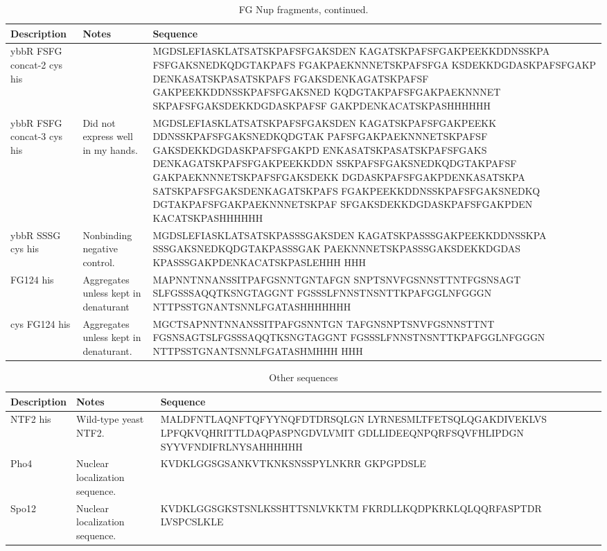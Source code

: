 \begin{table}[b!]
\centering
  \caption[FG Nup sequences, continued.]{FG Nup fragments, continued.}
    \label{table:FSFG}
    \begin{tabular}{p{3.5cm}p{4cm}p{8cm}}
      Description & Notes &Sequence \\
\hline
	ybbR FSFG concat-2 cys his& & MGDSLEFIASKLATSATSKPAFSFGAKSDEN
KAGATSKPAFSFGAKPEEKKDDNSSKPA
FSFGAKSNEDKQDGTAKPAFS
FGAKPAEKNNNETSKPAFSFGA
KSDEKKDGDASKPAFSFGAKP
DENKASATSKPASATSKPAFS
FGAKSDENKAGATSKPAFSF
GAKPEEKKDDNSSKPAFSFGAKSNED
KQDGTAKPAFSFGAKPAEKNNNET
SKPAFSFGAKSDEKKDGDASKPAFSF
GAKPDENKACATSKPASHHHHHH\\
      \hline
	ybbR FSFG concat-3 cys his& Did not express well in my hands.& MGDSLEFIASKLATSATSKPAFSFGAKSDEN
KAGATSKPAFSFGAKPEEKK
DDNSSKPAFSFGAKSNEDKQDGTAK
PAFSFGAKPAEKNNNETSKPAFSF
GAKSDEKKDGDASKPAFSFGAKPD
ENKASATSKPASATSKPAFSFGAKS
DENKAGATSKPAFSFGAKPEEKKDDN
SSKPAFSFGAKSNEDKQDGTAKPAFSF
GAKPAEKNNNETSKPAFSFGAKSDEKK
DGDASKPAFSFGAKPDENKASATSKPA
SATSKPAFSFGAKSDENKAGATSKPAFS
FGAKPEEKKDDNSSKPAFSFGAKSNEDKQ
DGTAKPAFSFGAKPAEKNNNETSKPAF
SFGAKSDEKKDGDASKPAFSFGAKPDEN
KACATSKPASHHHHHH\\
\hline
ybbR SSSG cys his & Nonbinding negative control. & MGDSLEFIASKLATSATSKPASSSGAKSDEN
KAGATSKPASSSGAKPEEKKDDNSSKPA
SSSGAKSNEDKQDGTAKPASSSGAK
PAEKNNNETSKPASSSGAKSDEKKDGDAS
KPASSSGAKPDENKACATSKPASLEHHH
HHH\\
	\hline

	FG124 his& Aggregates unless kept in denaturant & MAPNNTNNANSSITPAFGSNNTGNTAFGN
SNPTSNVFGSNNSTTNTFGSNSAGT
SLFGSSSAQQTKSNGTAGGNT
FGSSSLFNNSTNSNTTKPAFGGLNFGGGN
NTTPSSTGNANTSNNLFGATASHHHHHHH\\
\hline
	cys FG124 his& Aggregates unless kept in denaturant. & MGCTSAPNNTNNANSSITPAFGSNNTGN
TAFGNSNPTSNVFGSNNSTTNT
FGSNSAGTSLFGSSSAQQTKSNGTAGGNT
FGSSSLFNNSTNSNTTKPAFGGLNFGGGN
NTTPSSTGNANTSNNLFGATASHMHHH
HHH\\
\hline
    \end{tabular}
\end{table}
\newpage
\begin{table}[b!]
\centering
  \caption[Other sequences.]{Other sequences}
    \label{table:sequences}
    \begin{tabular}{p{3.5cm}p{4cm}p{8cm}}
      Description & Notes &Sequence \\


\hline
	
NTF2 his & Wild-type yeast NTF2. & MALDFNTLAQNFTQFYYNQFDTDRSQLGN
LYRNESMLTFETSQLQGAKDIVEKLVS
LPFQKVQHRITTLDAQPASPNGDVLVMIT
GDLLIDEEQNPQRFSQVFHLIPDGN
SYYVFNDIFRLNYSAHHHHHH\\
	\hline
Pho4 & Nuclear localization sequence. & KVDKLGGSGSANKVTKNKSNSSPYLNKRR
GKPGPDSLE \\
\hline
Spo12 & Nuclear localization sequence. & KVDKLGGSGKSTSNLKSSHTTSNLVKKTM
FKRDLLKQDPKRKLQLQQRFASPTDR
LVSPCSLKLE
 \\

\hline
    \end{tabular}
\end{table}